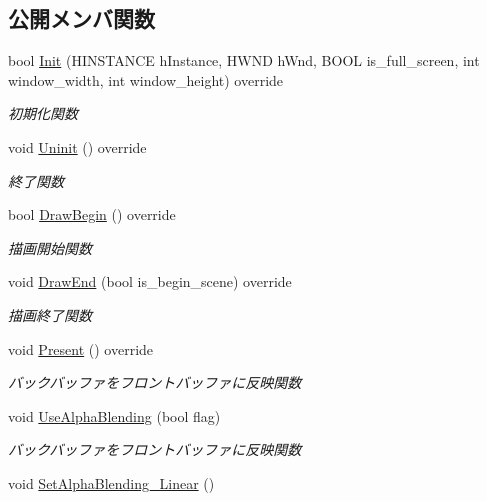 \subsection*{公開メンバ関数}
\begin{DoxyCompactItemize}
\item 
bool \mbox{\hyperlink{class_renderer_direct_x9_af015676b50f3ce1ba7cf20abf6074e3b}{Init}} (H\+I\+N\+S\+T\+A\+N\+CE h\+Instance, H\+W\+ND h\+Wnd, B\+O\+OL is\+\_\+full\+\_\+screen, int window\+\_\+width, int window\+\_\+height) override
\begin{DoxyCompactList}\small\item\em 初期化関数 \end{DoxyCompactList}\item 
void \mbox{\hyperlink{class_renderer_direct_x9_af7ff314cbaa894d71e37c10565002f8f}{Uninit}} () override
\begin{DoxyCompactList}\small\item\em 終了関数 \end{DoxyCompactList}\item 
bool \mbox{\hyperlink{class_renderer_direct_x9_a5113bf4e6aefdb7bcab2016fbbee0174}{Draw\+Begin}} () override
\begin{DoxyCompactList}\small\item\em 描画開始関数 \end{DoxyCompactList}\item 
void \mbox{\hyperlink{class_renderer_direct_x9_a5f934597020f77dc9cf729acfb13a830}{Draw\+End}} (bool is\+\_\+begin\+\_\+scene) override
\begin{DoxyCompactList}\small\item\em 描画終了関数 \end{DoxyCompactList}\item 
void \mbox{\hyperlink{class_renderer_direct_x9_a77dbc76e8adbe4f9ee41c5f09e5ebe81}{Present}} () override
\begin{DoxyCompactList}\small\item\em バックバッファをフロントバッファに反映関数 \end{DoxyCompactList}\item 
void \mbox{\hyperlink{class_renderer_direct_x9_aa555dda63bdc0f4dfc28ac506d6e8d60}{Use\+Alpha\+Blending}} (bool flag)
\begin{DoxyCompactList}\small\item\em バックバッファをフロントバッファに反映関数 \end{DoxyCompactList}\item 
void \mbox{\hyperlink{class_renderer_direct_x9_abfb5264cbb0bf3bacc7b4ec416ddc05a}{Set\+Alpha\+Blending\+\_\+\+Linear}} ()

\end{DoxyCompactItemize}
